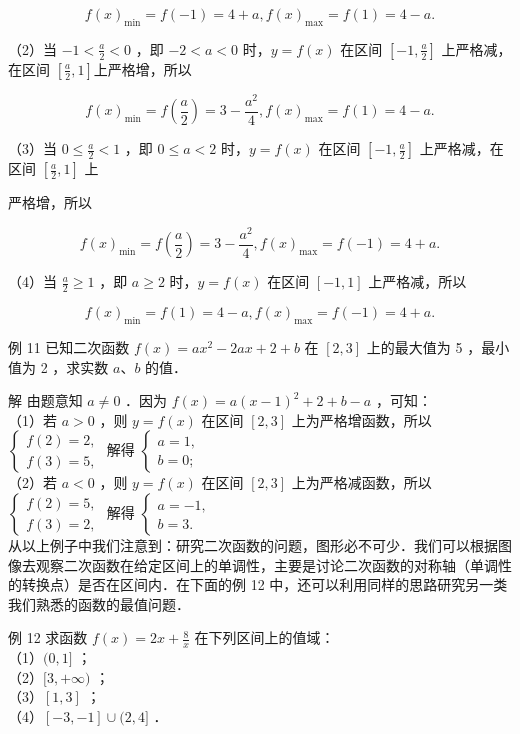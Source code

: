 \documentclass[10pt]{article}
\begin{document}
\[
f(x)_{\min }=f(-1)=4+a, f(x)_{\max }=f(1)=4-a .
\]

（2）当 \(-1<\frac{a}{2}<0\) ，即 \(-2<a<0\) 时，\(y=f(x)\) 在区间 \(\left[-1, \frac{a}{2}\right]\) 上严格减，在区间 \(\left[\frac{a}{2}, 1\right]\)上严格增，所以

\[
f(x)_{\min }=f\left(\frac{a}{2}\right)=3-\frac{a^{2}}{4}, f(x)_{\max }=f(1)=4-a .
\]

（3）当 \(0 \leqslant \frac{a}{2}<1\) ，即 \(0 \leqslant a<2\) 时，\(y=f(x)\) 在区间 \(\left[-1, \frac{a}{2}\right]\) 上严格减，在区间 \(\left[\frac{a}{2}, 1\right]\) 上

严格增，所以

\[
f(x)_{\min }=f\left(\frac{a}{2}\right)=3-\frac{a^{2}}{4}, f(x)_{\max }=f(-1)=4+a .
\]

（4）当 \(\frac{a}{2} \geqslant 1\) ，即 \(a \geqslant 2\) 时，\(y=f(x)\) 在区间 \([-1,1]\) 上严格减，所以

\[
f(x)_{\min }=f(1)=4-a, f(x)_{\max }=f(-1)=4+a .
\]

例 11 已知二次函数 \(f(x)=a x^{2}-2 a x+2+b\) 在 \([2,3]\) 上的最大值为 5 ，最小值为 2 ，求实数 \(a 、 b\) 的值．

解 由题意知 \(a \neq 0\) ．因为 \(f(x)=a(x-1)^{2}+2+b-a\) ，可知：\\
（1）若 \(a>0\) ，则 \(y=f(x)\) 在区间 \([2,3]\) 上为严格增函数，所以 \(\left\{\begin{array}{l}f(2)=2, \\ f(3)=5,\end{array}\right.\) 解得 \(\left\{\begin{array}{l}a=1, \\ b=0 ;\end{array}\right.\)\\
（2）若 \(a<0\) ，则 \(y=f(x)\) 在区间 \([2,3]\) 上为严格减函数，所以 \(\left\{\begin{array}{l}f(2)=5, \\ f(3)=2,\end{array}\right.\) 解得 \(\left\{\begin{array}{l}a=-1, \\ b=3 .\end{array}\right.\)\\
从以上例子中我们注意到：研究二次函数的问题，图形必不可少．我们可以根据图像去观察二次函数在给定区间上的单调性，主要是讨论二次函数的对称轴（单调性的转换点）是否在区间内．在下面的例 12 中，还可以利用同样的思路研究另一类我们熟悉的函数的最值问题．

例 12 求函数 \(f(x)=2 x+\frac{8}{x}\) 在下列区间上的值域：\\
（1）\((0,1]\) ；\\
（2）\([3,+\infty)\) ；\\
（3）\([1,3]\) ；\\
（4）\([-3,-1] \cup(2,4]\) ．
\end{document}
